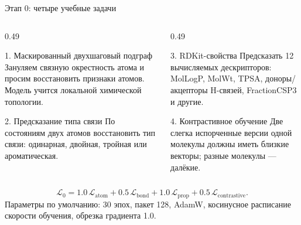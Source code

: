 \documentclass[aspectratio=169,10pt]{beamer}
\newcommand{\smallnote}[1]{{\scriptsize\color{TGSlate}#1}}
\begin{document}
\begin{frame}{Этап 0: четыре учебные задачи}
  \small
  \begin{columns}[T,onlytextwidth]
    \begin{column}{0.49\textwidth}
      \begin{block}{1. Маскированный двухшаговый подграф}
        \scriptsize
        Зануляем связную окрестность атома и просим восстановить признаки атомов. Модель учится локальной химической топологии.
      \end{block}
      \begin{block}{2. Предсказание типа связи}
        \scriptsize
        По состояниям двух атомов восстановить тип связи: одинарная, двойная, тройная или ароматическая.
      \end{block}
    \end{column}
    \begin{column}{0.49\textwidth}
      \begin{block}{3. RDKit-свойства}
        \scriptsize
        Предсказать 12 вычисляемых дескрипторов: MolLogP, MolWt, TPSA, доноры/акцепторы H-связей, FractionCSP3 и другие.
      \end{block}
      \begin{block}{4. Контрастивное обучение}
        \scriptsize
        Две слегка испорченные версии одной молекулы должны иметь близкие векторы; разные молекулы — далёкие.
      \end{block}
    \end{column}
  \end{columns}
  \vspace{0.25em}
  \[
    \mathcal L_{0}
    =
    1.0\,\mathcal L_{\mathrm{atom}}
    +0.5\,\mathcal L_{\mathrm{bond}}
    +1.0\,\mathcal L_{\mathrm{prop}}
    +0.5\,\mathcal L_{\mathrm{contrastive}}.
  \]
  \smallnote{Параметры по умолчанию: 30 эпох, пакет 128, AdamW, косинусное расписание скорости обучения, обрезка градиента 1.0.}
\end{frame}
\end{document}
